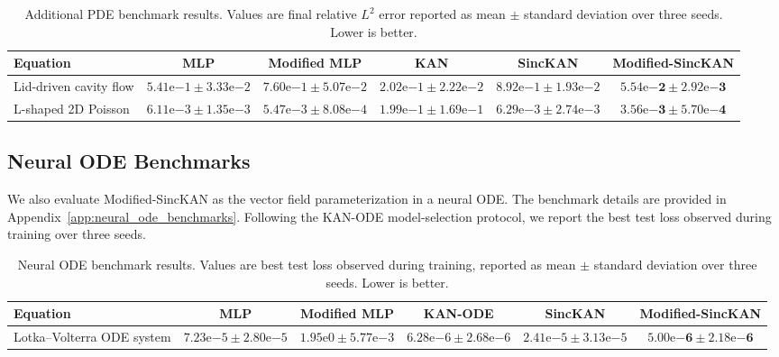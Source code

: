\documentclass[preprint,12pt]{elsarticle}
\begin{document}
\begin{table}[t]
\centering
\caption{Additional PDE benchmark results. Values are final relative \(L^2\) error reported as mean \(\pm\) standard deviation over three seeds. Lower is better.}
\label{tab:additional_pde}
\scriptsize
\setlength{\tabcolsep}{3pt}
\renewcommand{\arraystretch}{1.15}
\begin{tabular*}{\textwidth}{@{\extracolsep{\fill}}lccccc@{}}
\toprule
Equation & MLP & Modified MLP & KAN & SincKAN & Modified-SincKAN \\
\midrule
Lid-driven cavity flow & \(5.41\mathrm{e}{-1}\pm3.33\mathrm{e}{-2}\) & \(7.60\mathrm{e}{-1}\pm5.07\mathrm{e}{-2}\) & \(2.02\mathrm{e}{-1}\pm2.22\mathrm{e}{-2}\) & \(8.92\mathrm{e}{-1}\pm1.93\mathrm{e}{-2}\) & \(\mathbf{5.54\mathrm{e}{-2}\pm2.92\mathrm{e}{-3}}\) \\
L-shaped 2D Poisson & \(6.11\mathrm{e}{-3}\pm1.35\mathrm{e}{-3}\) & \(5.47\mathrm{e}{-3}\pm8.08\mathrm{e}{-4}\) & \(1.99\mathrm{e}{-1}\pm1.69\mathrm{e}{-1}\) & \(6.29\mathrm{e}{-3}\pm2.74\mathrm{e}{-3}\) & \(\mathbf{3.56\mathrm{e}{-3}\pm5.70\mathrm{e}{-4}}\) \\
\bottomrule
\end{tabular*}
\end{table}

\subsection{Neural ODE Benchmarks}

We also evaluate Modified-SincKAN as the vector field parameterization in a neural ODE. The benchmark details are provided in Appendix~\ref{app:neural_ode_benchmarks}. Following the KAN-ODE model-selection protocol, we report the best test loss observed during training over three seeds.

\begin{table}[t]
\centering
\caption{Neural ODE benchmark results. Values are best test loss observed during training, reported as mean \(\pm\) standard deviation over three seeds. Lower is better.}
\label{tab:neural_ode}
\scriptsize
\setlength{\tabcolsep}{3pt}
\renewcommand{\arraystretch}{1.15}
\begin{tabular}{lccccc}
\toprule
Equation & MLP & Modified MLP & KAN-ODE & SincKAN & Modified-SincKAN \\
\midrule
Lotka--Volterra ODE system & \(7.23\mathrm{e}{-5}\pm2.80\mathrm{e}{-5}\) & \(1.95\mathrm{e}{0}\pm5.77\mathrm{e}{-3}\) & \(6.28\mathrm{e}{-6}\pm2.68\mathrm{e}{-6}\) & \(2.41\mathrm{e}{-5}\pm3.13\mathrm{e}{-5}\) & \(\mathbf{5.00\mathrm{e}{-6}\pm2.18\mathrm{e}{-6}}\) \\
\bottomrule
\end{tabular}
\end{table}
\end{document}
